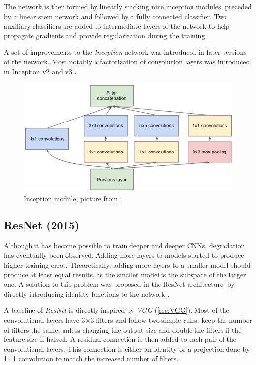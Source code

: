 The network is then formed by linearly stacking nine inception modules, preceded by a linear stem network and followed by a fully connected classifier. Two auxiliary classifiers are added to intermediate layers of the network to help propagate gradients and provide regularization during the training.

A set of improvements to the \textit{Inception} network was introduced in later versions of the network. Most notably a factorization of convolution layers was introduced in Inception v2 and v3 \cite{bib:inception2}.

\begin{figure}
    \includegraphics[width=\textwidth]{img/inception}
    \caption{Inception module, picture from \cite[figure 2]{bib:googlenet}.}
    \label{fig:incept_mod}
\end{figure}

\subsection{ResNet (2015)}
\label{sec:resnet}

Although it has become possible to train deeper and deeper CNNs, degradation has eventually been observed. Adding more layers to models started to produce higher training error. Theoretically, adding more layers to a smaller model should produce at least equal results, as the smaller model is the subspace of the larger one. A solution to this problem was proposed in the ResNet architecture, by directly introducing identity functions to the network \cite{bib:resnet}.  

A baseline of \textit{ResNet} is directly inspired by \textit{VGG} (\cref{sec:VGG}). Most of the convolutional layers have 3$\times$3 filters and follow two simple rules: keep the number of filters the same, unless changing the output size and double the filters if the feature size if halved. A residual connection is then added to each pair of the convolutional layers. This connection is either an identity or a projection done by 1$\times$1 convolution to match the increased number of filters. 

